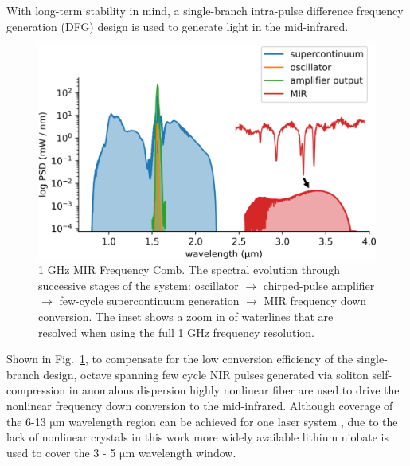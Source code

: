 \documentclass{optica-article}
\begin{document}
With long-term stability in mind, a single-branch intra-pulse difference frequency generation (DFG) design is used to generate light in the mid-infrared. 
% 
\begin{figure}[h]
    \centering
    \includegraphics[width=\linewidth]{spectrum_in_setup.png}
    \caption{1 GHz MIR Frequency Comb. The spectral evolution through successive stages of the system: oscillator $\rightarrow$ chirped-pulse amplifier $\rightarrow$ few-cycle supercontinuum generation $\rightarrow$ MIR frequency down conversion. The inset shows a zoom in of waterlines that are resolved when using the full 1 GHz frequency resolution.}
    \label{fig:spectrum_in_setup}
\end{figure}
%
Shown in \mbox{Fig. \ref{fig:spectrum_in_setup}}, to compensate for the low conversion efficiency of the single-branch design, octave spanning few cycle NIR pulses generated via soliton self-compression in anomalous dispersion highly nonlinear fiber are used to drive the nonlinear frequency down conversion to the mid-infrared. Although coverage of the 6-13 $\mathrm{\mu m}$ wavelength region can be achieved for one laser system \cite{hoghooghiBroadband1GHzMidinfrared2022}, due to the lack of nonlinear crystals in this work more widely available lithium niobate is used to cover the 3 - 5 $\mathrm{\mu m}$ wavelength window.
\end{document}
